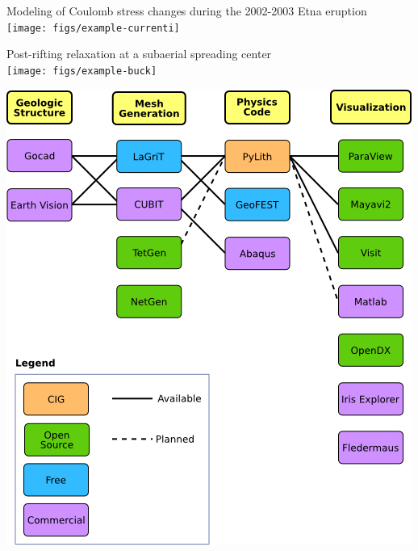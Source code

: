 \documentclass[pdftex,cig,slideColor]{pp4slides}
\begin{document}
  \begin{center}
    Modeling of Coulomb stress changes during the 2002-2003 Etna eruption \\
    \texttt{[image: figs/example-currenti]}
 \end{center}


  \vfill

  \begin{center}
    Post-rifting relaxation at a subaerial spreading center \\
    \texttt{[image: figs/example-buck]}
 \end{center}


  \vfill
  \begin{center}
    \includegraphics[scale=0.9]{figs/workflow}
  \end{center}
\end{document}
